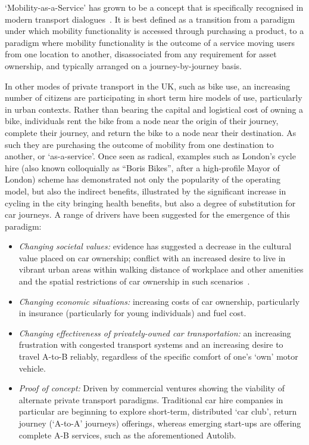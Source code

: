 \documentclass[b5paper,10pt]{article}
\begin{document}
`Mobility-as-a-Service' has grown to be a concept that is specifically
recognised in modern transport dialogues~\citep{tscatapult:2016}. It
is best defined as a transition from a paradigm under which mobility
functionality is accessed through purchasing a product, to a paradigm
where mobility functionality is the outcome of a service moving users
from one location to another, disassociated from any requirement for
asset ownership, and typically arranged on a journey-by-journey basis.

In other modes of private transport in the UK, such as bike use, an
increasing number of citizens are participating in short term hire
models of use, particularly in urban contexts. Rather than bearing the
capital and logistical cost of owning a bike, individuals rent the
bike from a node near the origin of their journey, complete
their journey, and return the bike to a node near their
destination. As such they are purchasing the outcome of mobility from
one destination to another, or `as-a-service'. Once seen as radical,
examples such as London's cycle hire (also known colloquially as
``Boris Bikes'', after a high-profile Mayor of London) scheme has
demonstrated not only the popularity of the operating model, but also
the indirect benefits, illustrated by the significant increase in
cycling in the city bringing health benefits, but also a degree of
substitution for car journeys. A range of drivers have been suggested
for the emergence of this paradigm:

\begin{itemize}
\item {\emph{Changing societal values:}} evidence has
suggested a decrease in the cultural value placed on car ownership;
conflict with an increased desire to live in vibrant urban areas
within walking distance of workplace and other amenities and the
spatial restrictions of car ownership in such
scenarios~\citep{jenks+burgess:2011}.
\item {\emph{Changing economic situations:}} increasing costs of car
ownership, particularly in insurance (particularly for young
individuals) and fuel cost.
\item {\emph{Changing effectiveness of privately-owned car
transportation:}} an increasing frustration with congested transport
systems and an increasing desire to travel A-to-B reliably,
regardless of the specific comfort of one's `own' motor vehicle.
\item {\emph{Proof of concept:}} Driven by commercial ventures showing
the viability of alternate private transport paradigms. Traditional
car hire companies in particular are beginning to explore short-term,
distributed `car club', return journey (`A-to-A' journeys) offerings,
whereas emerging start-ups are offering complete A-B services, such as
the aforementioned Autolib.
\end{itemize}
\end{document}
